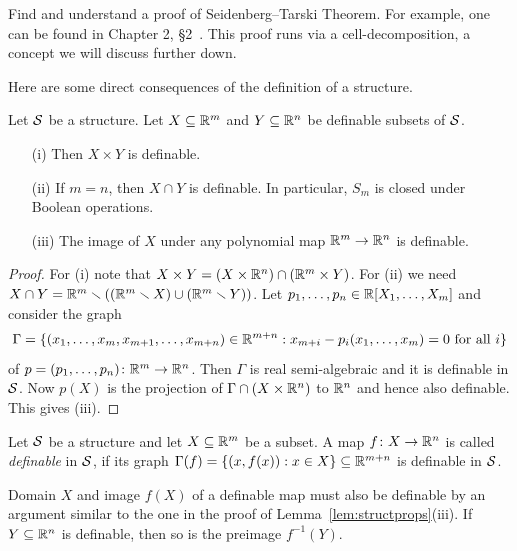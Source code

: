 \begin{exercise}
  Find and understand a proof of Seidenberg--Tarski Theorem. For
  example, one can be found in Chapter 2, \S 2~\cite{D:oMin}. This
  proof runs via a cell-decomposition, a concept we will discuss
  further down. 
\end{exercise}

Here are some direct consequences of the definition of a structure.  

\begin{lemma}
  \label{lem:structprops}
  Let ${\mathcal S}$ be a structure. Let $X\subseteq{\mathbb{R}}^m$ and $Y\subseteq{\mathbb{R}}^n$ be definable subsets of ${\mathcal S}$.
  \begin{enumerate}   
  \item [(i)] Then $X\times Y$ is definable.
  \item[(ii)] If $m=n$, then $X\cap Y$ is definable. In particular,
    $S_m$ is closed under Boolean operations.
  \item[(iii)] The image of $X$ under any polynomial map
    ${\mathbb{R}}^m\rightarrow {\mathbb{R}}^n$ is definable.
  \end{enumerate}
\end{lemma}
\begin{proof}
  For (i) note that $X\times Y =  (X\times {\mathbb{R}}^n)\cap ({\mathbb{R}}^m\times
  Y)$. For (ii) we need $X\cap Y = {\mathbb{R}}^m\smallsetminus (({\mathbb{R}}^m\smallsetminus X)\cup ({\mathbb{R}}^m
  \smallsetminus Y))$.
  Let $p_1,\ldots,p_n\in{\mathbb{R}}[X_1,\ldots,X_m]$ and consider the graph
  \begin{equation*}
    \Gamma = \{(x_1,\ldots,x_m,x_{m+1},\ldots,x_{m+n})\in{\mathbb{R}}^{m+n} :
    x_{m+i}-p_i(x_1,\ldots,x_m)= 0 \text{ for all }
    i\} 
  \end{equation*}
  of $p=(p_1,\ldots,p_n)\colon {\mathbb{R}}^m\rightarrow{\mathbb{R}}^n$. Then $\Gamma$ is
  real semi-algebraic and it is definable in ${\mathcal S}$. Now $p(X)$ is the
  projection of $\Gamma \cap (X\times{\mathbb{R}}^n)$ to ${\mathbb{R}}^n$ and hence also
  definable. This gives (iii). 
\end{proof}

\begin{definition}
  Let ${\mathcal S}$ be a structure and let $X\subseteq{\mathbb{R}}^m$ be a subset.
  A map $f\colon X\rightarrow{\mathbb{R}}^n$ is
  called \emph{definable} in ${\mathcal S}$, if its graph $\Gamma(f) =
  \{(x,f(x)) : x\in X\}\subseteq{\mathbb{R}}^{m+n}$ is definable in ${\mathcal S}$.
\end{definition}

Domain $X$ and image $f(X)$ of a definable map must also be definable
by an argument similar to the one in the proof of
Lemma~\ref{lem:structprops}(iii). If $Y\subseteq {\mathbb{R}}^n$ is definable,
then so is the preimage $f^{-1}(Y)$. 


